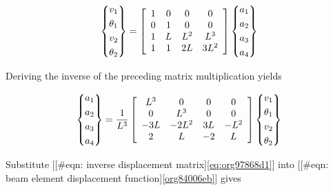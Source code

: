\documentclass[a4paper,openany,12pt]{book}
\begin{document}
{{$$\left\{ \begin{gathered}
  v_1 \hfill \\
  \theta _1 \hfill \\
  v_2 \hfill \\
  \theta _2 \hfill \\ 
\end{gathered}  \right\} = \left[ {\begin{array}{*{20}{c}}
  1&0&0&0 \\ 
  0&1&0&0 \\ 
  1&L&L^2&L^3 \\ 
  1&1&2L&3L^2 
\end{array}} \right]\left\{ \begin{gathered}
  a_1 \hfill \\
  a_2 \hfill \\
  a_3 \hfill \\
  a_4 \hfill \\ 
\end{gathered}  \right\}$$

Deriving the inverse of the preceding matrix multiplication yields

\begin{gather*}
\label{eq:org97868d1}
  \left\{
    \begin{gathered}
      a_1 \hfill \\
      a_2 \hfill \\
      a_3 \hfill \\
      a_4 \hfill \\ 
    \end{gathered}  \right\} = \frac{1}{L^3}\left[{
      \begin{array}{*{20}{c}}
        L^3&0&0&0 \\ 
        0&L^3&0&0 \\ 
        -3L&-2L^2&3L&-L^2 \\ 
        2&L&-2&L 
      \end{array}} \right]\left\{
    \begin{gathered}
      v_1 \hfill \\
      \theta_1 \hfill \\
      v_2 \hfill \\
      \theta_2 \hfill \\ 
    \end{gathered}  \right\}
\end{gather*}

Substitute
[[\#eqn: inverse displacement matrix]\ref{eq:org97868d1}]
into
[[\#eqn: beam element displacement function]\ref{org84006eb}]
gives

}}
\end{document}

